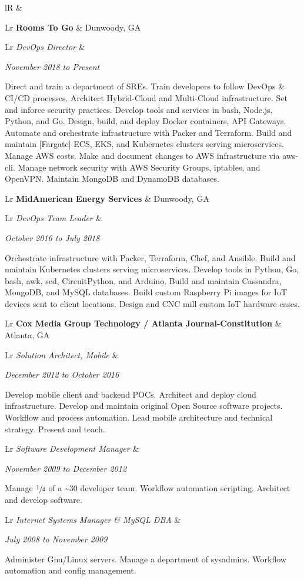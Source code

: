 \documentclass[letterpaper,10pt]{article}
\newcommand{\sizeF}[0]{\fontsize{11pt}{13pt}\selectfont}
\newcounter{skipfirstcounter}
\newcommand{\skipfirst}[1]{
    \ifthenelse{\equal{\value{skipfirstcounter}}{0}}{#1}{#1}
    \addtocounter{skipfirstcounter}{1}
}
\newcommand{\blocktitle}[1]{
    \setcounter{skipfirstcounter}{0}
    \begin{tabularx}{\textwidth}{lR}
        {\sizeF\sc{#1}} & \noindent\hrulefill\\
    \end{tabularx}
}
\newcommand{\blockExperience}[1]{
    \blocktitle{Career}%
    #1%
    \vspace{2mm}%
}
\newcommand{\sectionheaderfirst}[2]{
    \begin{tabularx}{\textwidth}{Lr}%
    \textbf{#1} & #2\\%
    \end{tabularx}%
}
\newcommand{\sectionheader}[2]{
    \vspace{2mm}%
    \sectionheaderfirst{#1}{#2}%
}
\newcommand{\sectionsub}[2]{
    {\def\arraystretch{1}
        \begin{tabularx}{\textwidth}{Lr}
        \rowcolor[rgb]{.9,.9,.9}
        \emph{#1} &
        \rule{0mm}{3.2mm} %
        \emph{#2} \\
        \addlinespace[0.4mm]
        \end{tabularx}
    }
}
\newcommand{\sectionbody}[1]{
    #1
    \vspace{1mm}
}
\begin{document}
\blockExperience{
    \sectionheaderfirst
    {Rooms To Go}{Dunwoody, GA}
    \sectionsub
    {DevOps Director}
    {November 2018 to Present}
    \sectionbody{
    Direct and train a department of SREs.
    Train developers to follow DevOps & CI/CD processes.
    Architect Hybrid-Cloud and Multi-Cloud infrastructure.
    Set and inforce security practices.
    Develop tools and services in bash, Node.js, Python, and Go.
    Design, build, and deploy Docker containers, API Gateways.
    Automate and orchestrate infrastructure with Packer and Terraform.
    Build and maintain [Fargate] ECS, EKS, and Kubernetes clusters serving microservices.
    Manage AWS costs.
    Make and document changes to AWS infrastructure via aws-cli.
    Manage network security with AWS Security Groups, iptables, and OpenVPN.
    Maintain MongoDB and DynamoDB databases.
    }

    \sectionheader
    {MidAmerican Energy Services}{Dunwoody, GA}
    \sectionsub
    {DevOps Team Leader}
    {October 2016 to July 2018}
    \sectionbody{
    Orchestrate infrastructure with Packer, Terraform, Chef, and Ansible.
    Build and maintain Kubernetes clusters serving microservices.
    Develop tools in Python, Go, bash, awk, sed, CircuitPython, and Arduino.
    Build and maintain Cassandra, MongoDB, and MySQL databases.
    Build custom Raspberry Pi images for IoT devices sent to client locations.
    Design and CNC mill custom IoT hardware cases.
    }

    \sectionheader
    {Cox Media Group Technology / Atlanta Journal-Constitution}{Atlanta, GA}
    \sectionsub
    {Solution Architect, Mobile}
    {December 2012 to October 2016}
    \sectionbody{
    Develop mobile client and backend POCs.
    Architect and deploy cloud infrastructure.
    Develop and maintain original Open Source software projects.
    Workflow and process automation.
    Lead mobile architecture and technical strategy.
    Present and teach.
    }

    \sectionsub
    {Software Development Manager}
    {November 2009 to December 2012}
    \sectionbody{
    Manage $\sfrac{1}{4}$ of a \~{}30 developer team.
    Workflow automation scripting.
    Architect and develop software.
    }

    \sectionsub
    {Internet Systems Manager \& MySQL DBA}
    {July 2008 to November 2009}
    \sectionbody{
    Administer Gnu/Linux servers.
    Manage a department of sysadmins.
    Workflow automation and config management.
    }

}
\end{document}
